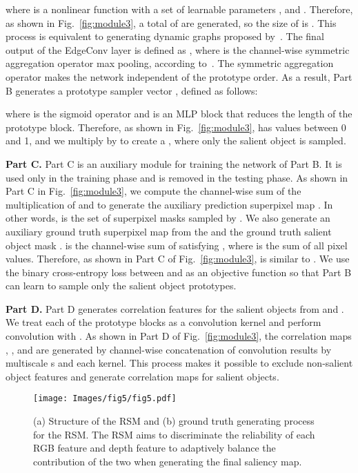 \documentclass[runningheads]{llncs}
\begin{document}
	\noindent
	where  is a nonlinear function with a set of learnable parameters , and . Therefore, as shown in Fig.~\ref{fig:module3}, a total of   are generated, so the size of  is . This process is equivalent to generating dynamic graphs proposed by~\cite{wang2019dynamic}. The final output  of the EdgeConv layer is defined as , where  is the channel-wise symmetric aggregation operator max pooling, according to~\cite{wang2019dynamic}. The symmetric aggregation operator makes the network independent of the prototype order. As a result, Part B generates a prototype sampler vector , defined as follows:
	
	
	
	\noindent
	where  is the sigmoid operator and  is an MLP block that reduces the length of the prototype block. Therefore, as shown in Fig.~\ref{fig:module3},  has values between 0 and 1, and we multiply  by  to create a , where only the salient object is sampled.
	
	\noindent
	\textbf{Part C.} Part C is an auxiliary module for training the network of Part B. It is used only in the training phase and is removed in the testing phase. As shown in Part C in Fig.~\ref{fig:module3}, we compute the channel-wise sum of the multiplication of  and  to generate the auxiliary prediction superpixel map . In other words,  is the set of superpixel masks sampled by . We also generate an auxiliary ground truth superpixel map  from the  and the ground truth salient object mask .  is the channel-wise sum of  satisfying , where  is the sum of all pixel values. Therefore, as shown in Part C of Fig.~\ref{fig:module3},  is similar to . We use the binary cross-entropy loss between  and  as an objective function so that Part B can learn to sample only the salient object prototypes.
	
	\noindent
	\textbf{Part D.} Part D generates correlation features for the salient objects from  and . We treat each of the prototype blocks  as a  convolution kernel and perform convolution with . As shown in Part D of Fig.~\ref{fig:module3}, the correlation maps , , and  are generated by channel-wise concatenation of convolution results by multiscale s and each  kernel. This process makes it possible to exclude non-salient object features and generate correlation maps for salient objects.
	
	\begin{figure}[t]
		\setlength{\belowcaptionskip}{-24pt}
		\begin{center}
			\texttt{[image: Images/fig5/fig5.pdf]}
			\caption{(a) Structure of the RSM and (b) ground truth generating process for the RSM. The RSM aims to discriminate the reliability of each RGB feature and depth feature to adaptively balance the contribution of the two when generating the final saliency map.}
			\label{fig:RSM}
		\end{center}
	\end{figure} 
	
\end{document}
